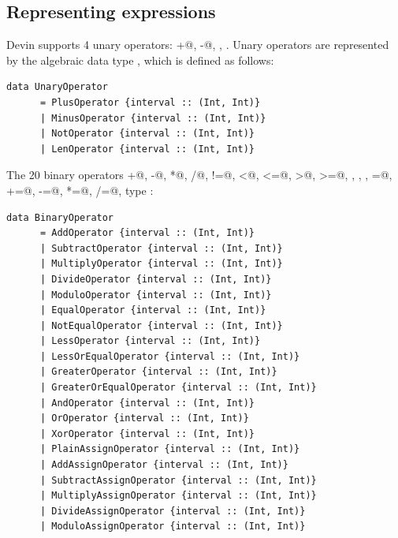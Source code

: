 \documentclass[UdineBachThesis,american,11pt]{PhdThesis}
\begin{document}
  \newpage

  \subsection{Representing expressions}

  Devin supports 4 unary operators: \lstinline@+@, \lstinline@-@,
  \lstinline@not@, \lstinline@len@. Unary operators are represented by the
  algebraic data type \lstinline@UnaryOperator@, which is defined as follows:\

  \begin{lstlisting}[gobble=4,basicstyle=\ttfamily\small]
    data UnaryOperator
      = PlusOperator {interval :: (Int, Int)}
      | MinusOperator {interval :: (Int, Int)}
      | NotOperator {interval :: (Int, Int)}
      | LenOperator {interval :: (Int, Int)}
  \end{lstlisting}

  The 20 binary operators \lstinline@+@, \lstinline@-@, \lstinline@*@,
  \lstinline@/@, \lstinline@%@, \lstinline@==@,
  \lstinline@!=@, \lstinline@<@, \lstinline@<=@, \lstinline@>@, \lstinline@>=@,
  \lstinline@and@, \lstinline@or@, \lstinline@xor@, \lstinline@=@,
  \lstinline@+=@, \lstinline@-=@, \lstinline@*=@, \lstinline@/=@,
  \lstinline@%=@ are represented by the
  type \lstinline@BinaryOperator@:

  \begin{lstlisting}[gobble=4,basicstyle=\ttfamily\small]
    data BinaryOperator
      = AddOperator {interval :: (Int, Int)}
      | SubtractOperator {interval :: (Int, Int)}
      | MultiplyOperator {interval :: (Int, Int)}
      | DivideOperator {interval :: (Int, Int)}
      | ModuloOperator {interval :: (Int, Int)}
      | EqualOperator {interval :: (Int, Int)}
      | NotEqualOperator {interval :: (Int, Int)}
      | LessOperator {interval :: (Int, Int)}
      | LessOrEqualOperator {interval :: (Int, Int)}
      | GreaterOperator {interval :: (Int, Int)}
      | GreaterOrEqualOperator {interval :: (Int, Int)}
      | AndOperator {interval :: (Int, Int)}
      | OrOperator {interval :: (Int, Int)}
      | XorOperator {interval :: (Int, Int)}
      | PlainAssignOperator {interval :: (Int, Int)}
      | AddAssignOperator {interval :: (Int, Int)}
      | SubtractAssignOperator {interval :: (Int, Int)}
      | MultiplyAssignOperator {interval :: (Int, Int)}
      | DivideAssignOperator {interval :: (Int, Int)}
      | ModuloAssignOperator {interval :: (Int, Int)}
  \end{lstlisting}
\end{document}
